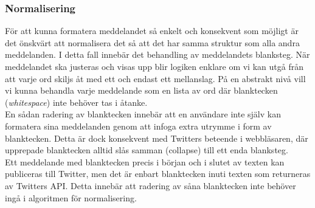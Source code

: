 \documentclass[a4paper,11pt]{article}
\begin{document}
\subsubsection{Normalisering}
För att kunna formatera meddelandet så enkelt och konsekvent som möjligt är det önskvärt att normalisera det så att det har samma struktur som alla andra meddelanden. I detta fall innebär det behandling av meddelandets blanksteg. När meddelandet ska justeras och visas upp blir logiken enklare om vi kan utgå från att varje ord skiljs åt med ett och endast ett mellanslag. På en abstrakt nivå vill vi kunna behandla varje meddelande som en lista av ord där blanktecken ({\it whitespace}) inte behöver tas i åtanke. \\

En sådan radering av blanktecken innebär att en användare inte själv kan formatera sina meddelanden genom att infoga extra utrymme i form av blanktecken. Detta är dock konsekvent med Twitters beteende i webbläsaren, där upprepade blanktecken alltid slås samman (collapse) till ett enda blanksteg. \\

Ett meddelande med blanktecken precis i början och i slutet av texten kan publiceras till Twitter, men det är enbart blanktecken inuti texten som returneras av Twitters API. Detta innebär att radering av såna blanktecken inte behöver ingå i algoritmen för normalisering.
\end{document}
